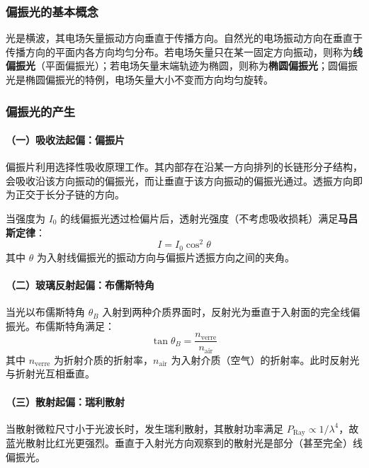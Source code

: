 \documentclass[dvipsnames, svgnames,a4paper,11pt]{article}
\begin{document}
\subsubsection{偏振光的基本概念}

光是横波，其电场矢量振动方向垂直于传播方向。自然光的电场振动方向在垂直于传播方向的平面内各方向均匀分布。若电场矢量只在某一固定方向振动，则称为\textbf{线偏振光}（平面偏振光）；若电场矢量末端轨迹为椭圆，则称为\textbf{椭圆偏振光}；圆偏振光是椭圆偏振光的特例，电场矢量大小不变而方向均匀旋转。

\subsubsection{偏振光的产生}

\paragraph{（一）吸收法起偏：偏振片}

偏振片利用选择性吸收原理工作。其内部存在沿某一方向排列的长链形分子结构，会吸收沿该方向振动的偏振光，而让垂直于该方向振动的偏振光通过。透振方向即为正交于长分子链的方向。

当强度为 $I_0$ 的线偏振光透过检偏片后，透射光强度（不考虑吸收损耗）满足\textbf{马吕斯定律}：
\begin{equation}
    I = I_0 \cos^2\theta
\end{equation}
其中 $\theta$ 为入射线偏振光的振动方向与偏振片透振方向之间的夹角。

\paragraph{（二）玻璃反射起偏：布儒斯特角}

当光以布儒斯特角 $\theta_B$ 入射到两种介质界面时，反射光为垂直于入射面的完全线偏振光。布儒斯特角满足：
\begin{equation}
    \tan\theta_B = \frac{n_{\text{verre}}}{n_{\text{air}}}
\end{equation}
其中 $n_{\text{verre}}$ 为折射介质的折射率，$n_{\text{air}}$ 为入射介质（空气）的折射率。此时反射光与折射光互相垂直。

\paragraph{（三）散射起偏：瑞利散射}

当散射微粒尺寸小于光波长时，发生瑞利散射，其散射功率满足 $P_{\text{Ray}} \propto 1/\lambda^4$，故蓝光散射比红光更强烈。垂直于入射光方向观察到的散射光是部分（甚至完全）线偏振光。
\end{document}
